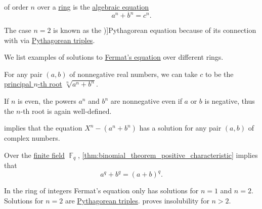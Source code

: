 \begin{definition}\label{def:fermats_equation}
   of order \( n \) over a \hyperref[def:ring]{ring} is the \hyperref[def:algebraic_equation]{algebraic equation}
  \begin{equation}\label{eq:def:fermats_equation}
    a^n + b^n = c^n.
  \end{equation}

  The case \( n = 2 \) is known as the \term[en=Pythagorean equation (\cite[\S 4.3.1]{Deza2012FigurateNumbers})]{Pythagorean equation} because of its connection with  via \hyperref[def:pythagorean_triple]{Pythagorean triples}.
\end{definition}

\begin{example}\label{ex:def:fermats_equation}
  We list examples of solutions to \hyperref[def:fermats_equation]{Fermat's equation} over different rings.
  \begin{thmenum}
     For any pair \( (a, b) \) of nonnegative real numbers, we can take \( c \) to be the \hyperref[def:principal_nonnegative_nth_root]{principal \( n \)-th root} \( \sqrt[n]{ a^n + b^n } \).

    If \( n \) is even, the powers \( a^n \) and \( b^n \) are nonnegative even if \( a \) or \( b \) is negative, thus the \( n \)-th root is again well-defined.

      implies that the equation \( X^n - (a^n + b^n) \) has a solution for any pair \( (a, b) \) of complex numbers.

     Over the \hyperref[def:finite_field]{finite field} \( \BbbF_q \), \cref{thm:binomial_theorem_positive_characteristic} implies that
    \begin{equation*}
      a^q + b^q = (a + b)^q.
    \end{equation*}

     In the ring of integers Fermat's equation only has solutions for \( n = 1 \) and \( n = 2 \). Solutions for \( n = 2 \) are \hyperref[def:pythagorean_triple]{Pythagorean triples}.  proves insolubility for \( n > 2 \).
  \end{thmenum}
\end{example}

